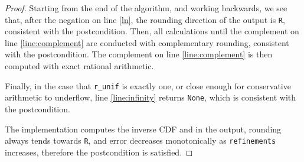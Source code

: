 \documentclass{article}
\begin{document}
\begin{proof}
Starting from the end of the algorithm, and working backwards, we see that, after the negation on line \ref{ln},
the rounding direction of the output is \texttt{R}, consistent with the postcondition.
Then, all calculations until the complement on line \ref{line:complement} are conducted with complementary rounding,
consistent with the postcondition.
The complement on line \ref{line:complement} is then computed with exact rational arithmetic.

Finally, in the case that \texttt{r\_unif} is exactly one, or close enough for conservative arithmetic to underflow,
line \ref{line:infinity} returns \texttt{None}, which is consistent with the postcondition.

The implementation computes the inverse CDF and in the output, rounding always tends towards \texttt{R}, 
and error decreases monotonically as \texttt{refinements} increases,
therefore the postcondition is satisfied.
\end{proof}
\end{document}
